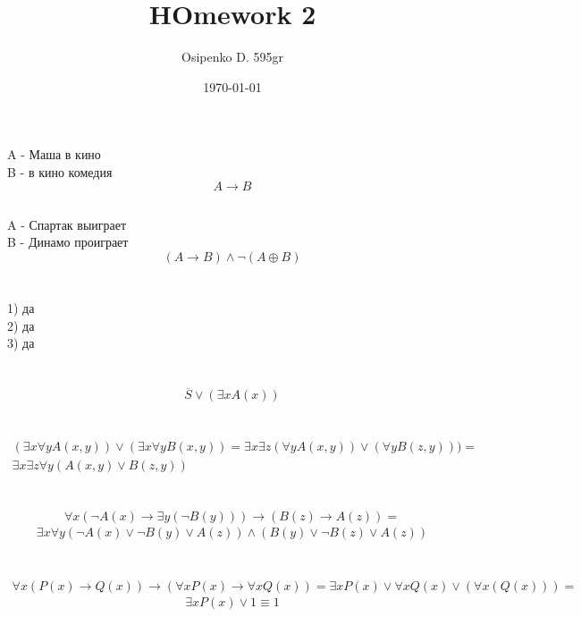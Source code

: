 \documentclass[a4paper, 12pt]{article}
\title{HOmework 2}
\author{Osipenko D. 595gr}
\date{\today}
\begin{document}
\sffamily
\maketitle
\section{}
\subsection{}
A - Маша в кино\\
B - в кино комедия\\

\[
	A \to B
\]

\subsection{}
A - Спартак выиграет\\
B - Динамо проиграет\\
\[
	(A \to B) \land \lnot(A \oplus B)
\]

\section{}
1) да\\
2) да\\
3) да\\
\section{}
\[
	\overline{S} \lor(\exists x A(x))
\]
\section{}
\begin{align*}
	( \exists  x \forall y A( x, y) ) \lor ( \exists  x \forall y B( x, y) ) =  \exists  x  \exists z(\forall y A( x, y) ) \lor ( \forall y B( z, y) )) =\\ \exists  x  \exists z \forall y(A( x, y)  \lor  B( z, y) )
\end{align*}


\section{}
\[
	\forall x(\lnot A(x) \to \exists y(\lnot B(y))) \to (B(z) \to A(z)) =
\]
\begin{align*}
	\exists  x \forall y(\lnot A(x) \lor \lnot B(y) \lor A(z))\land (B(y) \lor \lnot B(z) \lor  A(z))
\end{align*}

\section{}
\begin{align*}
	\forall x (P(x) \to Q(x)) \to (\forall x P(x) \to \forall x Q(x)) = \exists x P(x) \lor \forall x Q(x) \lor (\forall x (Q(x))) =
\end{align*}
\[
	\exists x P(x) \lor 1 \equiv 1
\]
\end{document}
